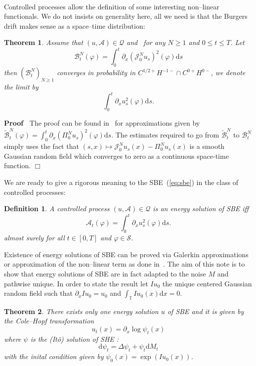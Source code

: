 \documentclass[a4paper,11pt]{article}
\newcommand{\mathd}{\mathrm{d}}
\newenvironment{proof}{\noindent\textbf{Proof\ }}{\hspace*{\fill}$\Box$\medskip}
\newtheorem{definition}{Definition}
\newtheorem{theorem}{Theorem}
\newcommand{\cS}{\mathscr{S}}
\newcommand{\JJ}{\mathcal{J}}
\begin{document}
\

Controlled processes allow the definition of some interesting non--linear
functionals. We do not insists on generality here, all we need is that the
Burgers drift makes sense as a space--time distribution:

\begin{theorem}
  Assume that $(u, \mathcal{A}) \in \mathcal{Q}$ and \ for any $N \geqslant 1$
  and $0 \leqslant t \leqslant T$. Let
  \[ \mathcal{B}^N_t (\varphi) = \int_0^t \partial_x \left( \JJ^N_0 u_s
     \right)^2 (\varphi) \mathd s \]
  then $(\mathcal{B}^N_t)_{N \geqslant 1}$ converges in probability in $C^{1 /
  2 +} H^{- 1 -} \cap C^{0 +} H^{0 -}$, we denote the limit by
  \[ \int_0^t \partial_x u_s^2 (\varphi) \mathd s. \]
\end{theorem}

\begin{proof}
  The proof can be found
  in~{\cite{gubinelli_regularization_2013,gubinelli_lectures_2015}} for
  approximations given by $\tilde{\mathcal{B}}^N_t (\varphi) = \int_0^t
  \partial_x (\Pi^N_0 u_s)^2 (\varphi) \mathd s$. The estimates required to go
  from $\tilde{\mathcal{B}}^N_t$ to $\mathcal{B}^N_t$ simply uses the fact
  that $(s, x) \mapsto \JJ^N_0 u_s (x) - \Pi^N_0 u_s (x)$ is a smooth Gaussian
  random field which converges to zero as a continuous space-time function. 
\end{proof}

We are ready to give a rigorous meaning to the SBE~(\ref{eq:sbe}) in the class
of controlled processes:

\begin{definition}
  A controlled process $(u, \mathcal{A}) \in \mathcal{Q}$ is an energy
  solution of SBE iff
  \[ \mathcal{A}_t (\varphi) = \int_0^t \partial_x u_s^2 (\varphi) \mathd s.
  \]
  almost surely for all $t \in [0, T]$ and $\varphi \in \cS$.
\end{definition}

Existence of energy solutions of SBE can be proved via Galerkin approximations
or approximation of the non--linear term as done
in~{\cite{gubinelli_regularization_2013,gubinelli_lectures_2015}}. The aim of
this note is to show that energy solutions of SBE are in fact adapted to the
noise $M$ and pathwise unique. In order to state the result let $I u_0$ the
unique centered Gaussian random field such that $\partial_x I u_0 = u_0$ and
$\int_{\mathbb{T}} I u_0 (x) \mathd x = 0$.

\begin{theorem}
  \label{th:uniqueness}There exists only one energy solution $u$ of SBE and it
  is given by the Cole--Hopf transformation
  \[ u_t (x) = \partial_x \log \psi_t (x) \]
  where $\psi$ is the (It{\^o}) solution of SHE :
  \[ \mathd \psi_t = \Delta \psi_t + \psi_t \mathd M_t \]
  with the inital condition given by $\psi_0 (x) = \exp (I u_0 (x))$.
\end{theorem}
\end{document}
